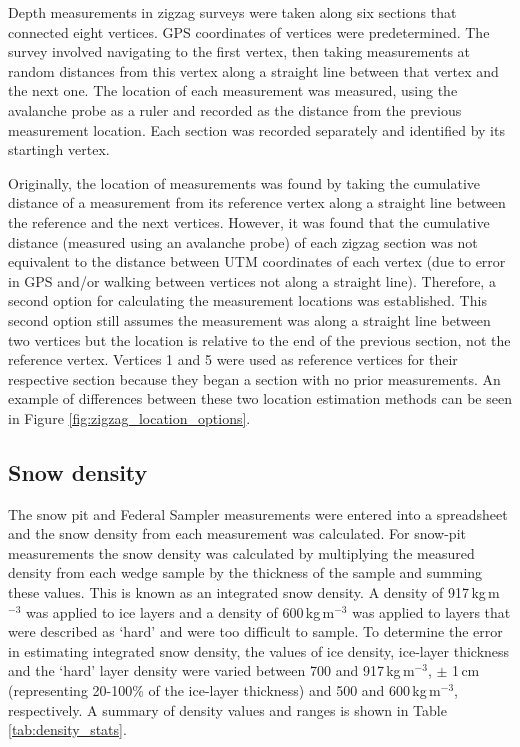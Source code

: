 \documentclass{sfuthesis}
\begin{document}
Depth measurements in zigzag surveys were taken along six sections that connected eight vertices. GPS coordinates of vertices were predetermined. The survey involved navigating to the first vertex, then taking measurements at random distances from this vertex along a straight line between that vertex and the next one. The location of each measurement was measured, using the avalanche probe as a ruler and recorded as the distance from the previous measurement location. Each section was recorded separately and identified by its startingh vertex. 

Originally, the location of measurements was found by taking the cumulative distance of a measurement from its reference vertex along a straight line between the reference and the next vertices. However, it was found that the cumulative distance (measured using an avalanche probe) of each zigzag section was not equivalent to the distance between UTM coordinates of each vertex (due to error in GPS and/or walking between vertices not along a straight line). Therefore, a second option for calculating the measurement locations was established. This second option still assumes the measurement was along a straight line between two vertices but the location is relative to the end of the previous section, not the reference vertex. Vertices 1 and 5 were used as reference vertices for their respective section because they began a section with no prior measurements. An example of differences between these two location estimation methods can be seen in Figure \ref{fig:zigzag_location_options}.


\subsection{Snow density}
\label{sec:snow_density_methods}

The snow pit and Federal Sampler measurements were entered into a spreadsheet and the snow density from each measurement was calculated. For snow-pit measurements the snow density was calculated by multiplying the measured density from each wedge sample by the thickness of the sample and summing these values. This is known as an integrated snow density. A density of 917\,kg\,m$^{-3}$ was applied to ice layers and a density of 600\,kg\,m$^{-3}$ was applied to layers that were described as `hard' and were too difficult to sample. To determine the error in estimating integrated snow density, the values of ice density, ice-layer thickness and the `hard' layer density were varied between 700 and 917\,kg\,m$^{-3}$, $\pm$ 1\,cm (representing 20-100\% of the ice-layer thickness) and 500 and 600\,kg\,m$^{-3}$, respectively.  A summary of density values and ranges is shown in Table \ref{tab:density_stats}.
\end{document}
